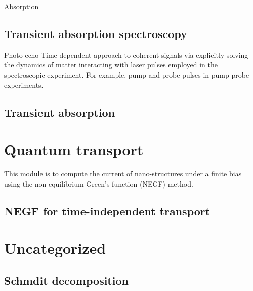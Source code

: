 \documentclass[a4paper,12pt]{book}
\begin{document}
Absorption
\section{Transient absorption spectroscopy}
Photo echo
Time-dependent approach to coherent signals via explicitly solving the dynamics of matter interacting with laser pulses employed in the spectroscopic experiment. For example, pump and probe pulses in pump-probe experiments.

\section{Transient absorption}

\chapter{ Quantum transport}
This module is to compute the current of nano-structures under a finite bias using the non-equilibrium Green's function (NEGF) method.

\section{NEGF for time-independent transport}


\chapter{Uncategorized}

\section{Schmdit decomposition}


\backmatter
\end{document}

